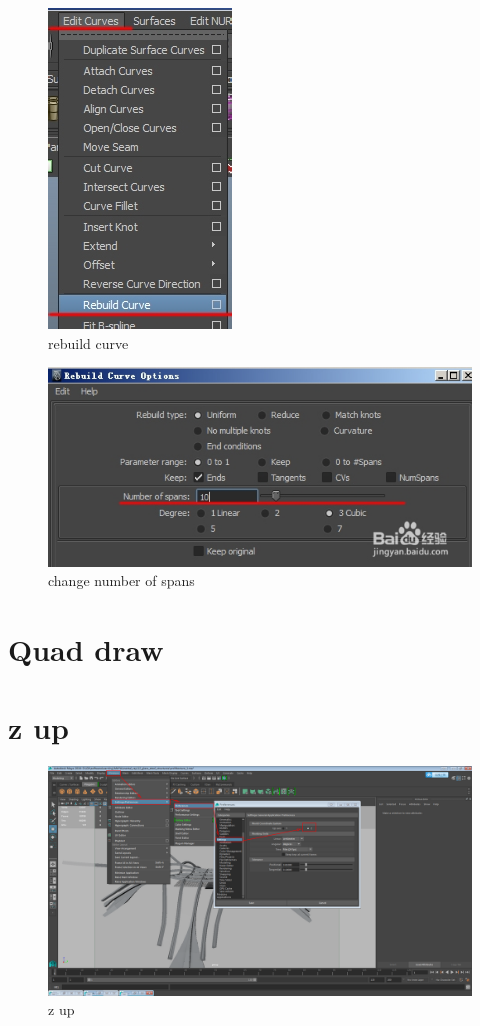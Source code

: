 \begin{figure}[!h]
	\centering
	\includegraphics[width=0.5\linewidth]{figures/rebuild_curve_menu}
	\caption{ rebuild curve}
	\label{fig:rebuildcurvemenu}
\end{figure}

\begin{figure}[!h]
	\centering
	\includegraphics[width=0.5\linewidth]{figures/rebuild_curve_option}
	\caption{change number of spans}
	\label{fig:rebuildcurveoption}
\end{figure}

\section{Quad draw}

\section{z up}
\begin{figure}
	\centering
	\includegraphics[width=0.7\linewidth]{figures/z_up/maya_z_up}
	\caption{z up}
	\label{fig:mayazup}
\end{figure}